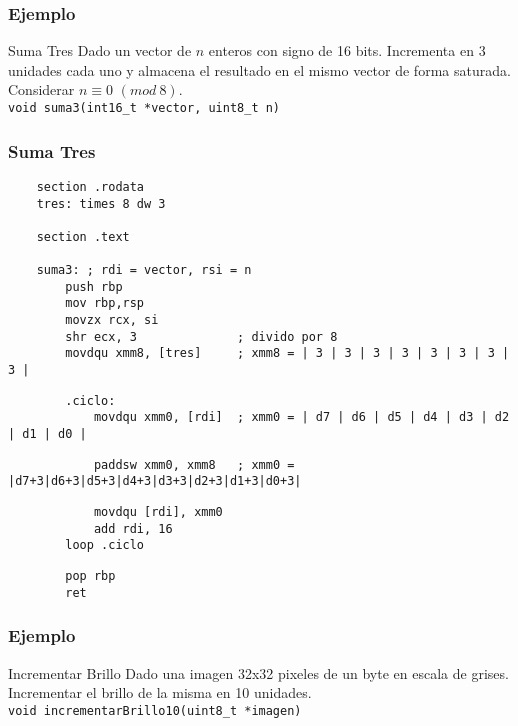 \documentclass[aspectratio=169]{beamer}
\begin{document}
\begin{frame}[fragile]
    \frametitle{Ejemplo}
    \begin{block}{Suma Tres}
    Dado un vector de $n$ enteros con signo de 16 bits. Incrementa en 3 unidades cada uno y almacena el resultado en el mismo vector de forma saturada.\\
    Considerar $n \equiv 0$ $(mod\ 8)$.\\
    \bigskip
    \verb|void suma3(int16_t *vector, uint8_t n)|
    \end{block}
\end{frame}

\begin{frame}[fragile]
    \frametitle{Suma Tres}
    \scriptsize
    \begin{verbatim}
    section .rodata
    tres: times 8 dw 3

    section .text

    suma3: ; rdi = vector, rsi = n
        push rbp
        mov rbp,rsp
        movzx rcx, si
        shr ecx, 3              ; divido por 8
        movdqu xmm8, [tres]     ; xmm8 = | 3 | 3 | 3 | 3 | 3 | 3 | 3 | 3 |
    \end{verbatim}
    \vspace{-0.8cm} \pause
    \begin{verbatim}
        .ciclo:
            movdqu xmm0, [rdi]  ; xmm0 = | d7 | d6 | d5 | d4 | d3 | d2 | d1 | d0 |
    \end{verbatim}
    \vspace{-0.8cm} \pause
    \begin{verbatim}
            paddsw xmm0, xmm8   ; xmm0 = |d7+3|d6+3|d5+3|d4+3|d3+3|d2+3|d1+3|d0+3|
    \end{verbatim}
    \vspace{-0.8cm} \pause
    \begin{verbatim}
            movdqu [rdi], xmm0
            add rdi, 16
        loop .ciclo
    \end{verbatim}
    \vspace{-0.8cm} \pause
    \begin{verbatim}
        pop rbp
        ret
    \end{verbatim}
\end{frame}

\begin{frame}[fragile]
    \frametitle{Ejemplo}
    \begin{block}{Incrementar Brillo}
    Dado una imagen 32x32 pixeles de un byte en escala de grises. Incrementar el brillo de la misma en 10 unidades.\\
    \verb|void incrementarBrillo10(uint8_t *imagen)|
    \end{block}
\end{frame}
\end{document}
